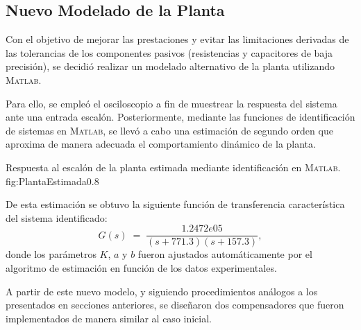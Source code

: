 \subsection{Nuevo Modelado de la Planta}

Con el objetivo de mejorar las prestaciones y evitar las limitaciones derivadas de las tolerancias de los componentes pasivos (resistencias y capacitores de baja precisión), se decidió realizar un modelado alternativo de la planta utilizando \textsc{Matlab}.

Para ello, se empleó el osciloscopio a fin de muestrear la respuesta del sistema ante una entrada escalón. Posteriormente, mediante las funciones de identificación de sistemas en \textsc{Matlab}, se llevó a cabo una estimación de segundo orden que aproxima de manera adecuada el comportamiento dinámico de la planta.  

{Respuesta al escalón de la planta estimada mediante identificación en \textsc{Matlab}.}
{fig:PlantaEstimada}{0.8}

De esta estimación se obtuvo la siguiente función de transferencia característica del sistema identificado:
\begin{equation}
	G(s) \;=\; \frac{1.2472e05}{(s+771.3)(s+157.3)},
\end{equation}
donde los parámetros $K$, $a$ y $b$ fueron ajustados automáticamente por el algoritmo de estimación en función de los datos experimentales.  

A partir de este nuevo modelo, y siguiendo procedimientos análogos a los presentados en secciones anteriores, se diseñaron dos compensadores que fueron implementados de manera similar al caso inicial.

